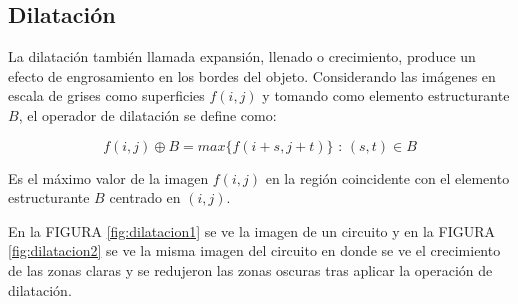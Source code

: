     \subsection{Dilatación}
    
    

La  dilatación  también  llamada  expansión,  llenado  o  crecimiento,  produce  un  efecto  de engrosamiento en los bordes del objeto. Considerando las imágenes en escala de grises como  superficies $f(i,j)$ y tomando como elemento estructurante $B$, el operador de dilatación se define como:

\begin{equation}
\label{eqa:dilatacionGrises}
f(i,j) \oplus{B} =max \{ f(i+s,j+t)\}  \text{ : } (s,t) \in B 
\end{equation}

%

Es el máximo valor de la imagen $f(i,j)$ en la región coincidente con el elemento estructurante $B$ centrado en $(i,j)$.


En la FIGURA \ref{fig:dilatacion1} se ve la imagen de un circuito y en la FIGURA \ref{fig:dilatacion2} se ve la misma imagen del circuito en donde se ve el crecimiento de las zonas claras y se redujeron las zonas oscuras tras aplicar la operación de dilatación.





